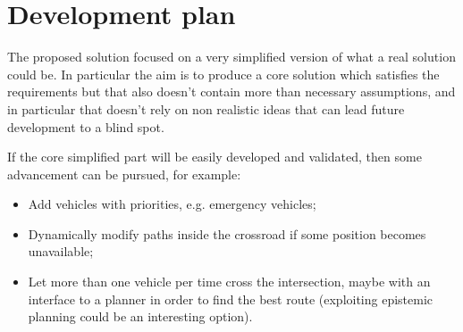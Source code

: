 \documentclass{memoir}
\begin{document}
\section{Development plan}
The proposed solution focused on a very simplified version of what a real solution could be. In particular the aim is to produce a core solution which satisfies the requirements but that also doesn't contain more than necessary assumptions, and in particular that doesn't rely on non realistic ideas that can lead future development to a blind spot.

If the core simplified part will be easily developed and validated, then some advancement can be pursued, for example:
\begin{itemize}
	\item Add vehicles with priorities, e.g. emergency vehicles;
	\item Dynamically modify paths inside the crossroad if some position becomes unavailable;
	\item Let more than one vehicle per time cross the intersection, maybe with an interface to a planner in order to find the best route (exploiting epistemic planning could be an interesting option).
\end{itemize}









\end{document}
